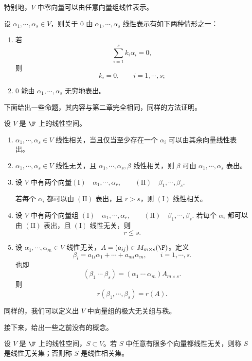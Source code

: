 特别地，$V$ 中零向量可以由任意向量组线性表示。

\begin{corollary}
	设 $\alpha_1,\cdots,\alpha_s\in V$，则关于 $0$ 由 $\alpha_1,\cdots,\alpha_s$ 线性表示有如下两种情形之一：
	\begin{enumerate}
		\item 若
		\[
		\sum_{i=1}^{s}k_i\alpha_i=0,
		\]
		则
		\[
		k_i=0,
		\qquad i=1,\cdots,s;
		\]
		\item $0$ 能由 $\alpha_1,\cdots,\alpha_s$ 无穷地表出。
	\end{enumerate}
\end{corollary}

下面给出一些命题，其内容与第二章完全相同，同样的方法证明。

\begin{proposition}
	设 $V$ 是 $\F$ 上的线性空间。
	\begin{enumerate}
		\item $\alpha_1,\cdots,\alpha_s\in V$ 线性相关，当且仅当至少存在一个 $\alpha_i$ 可以由其余向量线性表出。
		\item $\alpha_1,\cdots,\alpha_s\in V$ 线性无关，且 $\alpha_1,\cdots,\alpha_s,\beta$ 线性相关，则 $\beta$ 可由 $\alpha_1,\cdots,\alpha_s$ 表出。
		\item 设 $V$ 中有两个向量$ (\mathrm{I})\quad \alpha_1,\cdots,\alpha_r,
		\qquad
		(\mathrm{II})\quad \beta_1,\cdots,\beta_s.$
	
		若每个 $\alpha_i$ 都可以由 $(\mathrm{II})$ 表出，且 $r>s$，则 $(\mathrm{I})$ 线性相关。
		\item 设 $V$ 中有两个向量组
		$ (\mathrm{I})\quad \alpha_1,\cdots,\alpha_r,
		\qquad
		(\mathrm{II})\quad \beta_1,\cdots,\beta_s.$
		若每个 $\alpha_i$ 都可以由 $(\mathrm{II})$ 表出，且 $(\mathrm{I})$ 线性无关，则
		\[
		r\leq s.
		\]
		\item 设 $\alpha_1,\cdots,\alpha_m\in V$ 线性无关，$A=(a_{ij})\in M_{m\times s}(\F)$。定义
		\[
		\beta_i=a_{1i}\alpha_1+\cdots+a_{mi}\alpha_m,
		\qquad i=1,\cdots,s.
		\]
		也即
		\[
		(\beta_1\ \cdots\ \beta_s)
		=(\alpha_1\ \cdots\ \alpha_m)A_{m\times s}.
		\]
		则
		\[
		r(\beta_1,\cdots,\beta_s)=r(A).
		\]
	\end{enumerate}
\end{proposition}

同样的，我们可以定义出 $V$ 中向量组的极大无关组与秩。

接下来，给出一些之前没有的概念。 
\begin{definition}\label{p1:concept:c4-l173}
	设 $V$ 是 $\F$ 上的线性空间，$S\subset V$。若 $S$ 中任意有限多个向量都线性无关，则称 $S$ 是线性无关集；否则称 $S$ 是线性相关集。
\end{definition}


